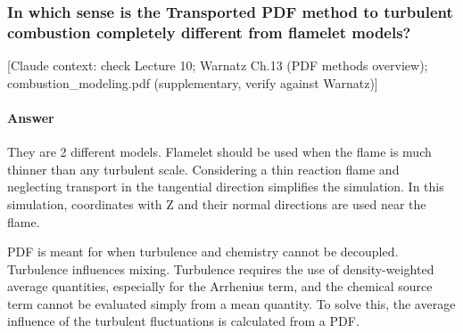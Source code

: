 {}




\subsubsection{In which sense is the Transported PDF method to turbulent combustion completely different from flamelet models?}

{\color{gray}\footnotesize [Claude context: check Lecture 10; Warnatz Ch.13 (PDF methods overview); combustion\_modeling.pdf (supplementary, verify against Warnatz)]}

\paragraph{Answer} They are 2 different models.
Flamelet should be used when the flame is much thinner than any turbulent scale. Considering a thin reaction flame and neglecting transport in the tangential direction simplifies the simulation. In this simulation, coordinates with Z and their normal directions are used near the flame. 

PDF is meant for when turbulence and chemistry cannot be decoupled. Turbulence influences mixing. Turbulence requires the use of density-weighted average quantities, especially for the Arrhenius term, and the chemical source term cannot be evaluated simply from a mean quantity. To solve this, the average influence of the turbulent fluctuations is calculated from a PDF.


